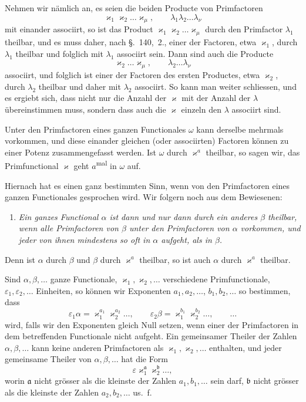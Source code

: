 \documentclass[12pt,a4paper]{article}
\theoremstyle{definition}
\begin{document}
Nehmen wir nämlich an, es seien die beiden Producte von Primfactoren
\begin{equation}\label{eq:141-6}
\varkappa_1\varkappa_2\dots\varkappa_\mu,\qquad \lambda_1\lambda_2\dots\lambda_\nu
\end{equation}
mit einander associirt, so ist das Product $\varkappa_1\varkappa_2\dots\varkappa_\mu$ durch den Primfactor $\lambda_1$ theilbar, und es muss daher, nach \S.~140,~2., einer der Factoren, etwa $\varkappa_1$, durch $\lambda_1$ theilbar und folglich mit $\lambda_1$ associirt sein. Dann sind auch die Producte
\[
\varkappa_2\dots\varkappa_\mu,\qquad \lambda_2\dots\lambda_\nu
\]
associirt, und folglich ist einer der Factoren des ersten Productes, etwa $\varkappa_2$, durch $\lambda_2$ theilbar und daher mit $\lambda_2$ associirt. So kann man weiter schliessen, und es ergiebt sich, dass nicht nur die Anzahl der $\varkappa$ mit der Anzahl der $\lambda$ übereinstimmen muss, sondern dass auch die $\varkappa$ einzeln den $\lambda$ associirt sind.

Unter den Primfactoren eines ganzen Functionales $\omega$ kann derselbe mehrmals vorkommen, und diese einander gleichen (oder associirten) Factoren können zu einer Potenz zusammengefasst werden. Ist $\omega$ durch $\varkappa^a$ theilbar, so sagen wir, das Primfunctional $\varkappa$ geht $a$\textsuperscript{mal} in $\omega$ auf.

Hiernach hat es einen ganz bestimmten Sinn, wenn von den Primfactoren eines ganzen Functionales gesprochen wird. Wir folgern noch aus dem Bewiesenen:

\begin{enumerate}[label=\arabic*., resume]
\item \textit{Ein ganzes Functional $\alpha$ ist dann und nur dann durch ein anderes $\beta$ theilbar, wenn alle Primfactoren von $\beta$ unter den Primfactoren von $\alpha$ vorkommen, und jeder von ihnen mindestens so oft in $\alpha$ aufgeht, als in $\beta$.}
\end{enumerate}

Denn ist $\alpha$ durch $\beta$ und $\beta$ durch $\varkappa^a$ theilbar, so ist auch $\alpha$ durch $\varkappa^a$ theilbar.

Sind $\alpha,\beta,\dots$ ganze Functionale, $\varkappa_1,\varkappa_2,\dots$ verschiedene Primfunctionale, $\varepsilon_1,\varepsilon_2,\dots$ Einheiten, so können wir Exponenten $a_1,a_2,\dots$, $b_1,b_2,\dots$ so bestimmen, dass
\[
\varepsilon_1\alpha = \varkappa_1^{a_1}\varkappa_2^{a_2}\dots,\qquad
\varepsilon_2\beta = \varkappa_1^{b_1}\varkappa_2^{b_2}\dots,\qquad \dots
\]
wird, falls wir den Exponenten gleich Null setzen, wenn einer der Primfactoren in dem betreffenden Functionale nicht aufgeht. Ein gemeinsamer Theiler der Zahlen $\alpha,\beta,\dots$ kann keine anderen Primfactoren als $\varkappa_1,\varkappa_2,\dots$ enthalten, und jeder gemeinsame Theiler von $\alpha,\beta,\dots$ hat die Form
\begin{equation}\label{eq:141-8}
\varepsilon\varkappa_1^{\mathfrak{a}}\varkappa_2^{\mathfrak{b}}\dots,
\end{equation}
worin $\mathfrak{a}$ nicht grösser als die kleinste der Zahlen $a_1,b_1,\dots$ sein darf, $\mathfrak{b}$ nicht grösser als die kleinste der Zahlen $a_2,b_2,\dots$ us.\ f.
\end{document}
